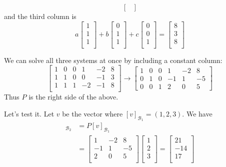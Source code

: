 \documentclass{article}
\begin{document}
\begin{example}
\[\begin{bmatrix}
    \end{bmatrix}
  \] and the third column is \[
    a
    \begin{bmatrix}
      1 \\1\\1\\
    \end{bmatrix}+b
    \begin{bmatrix}
      0 \\1\\1\\
    \end{bmatrix} + c
    \begin{bmatrix}
      0 \\0\\1\\
    \end{bmatrix} =
    \begin{bmatrix}
      8 \\3\\8\\
    \end{bmatrix}
  \]

  We can solve all three systems at once by including a constant column:
  \[
    \left[
      \begin{array}{ccc|ccc}
        1 & 0 & 0 & 1  & -2 & 8 \\
        1 & 1 & 0 & 0  & -1 & 3 \\
        1 & 1 & 1 & -2 & -1 & 8 \\
      \end{array}\right] \to \left[
      \begin{array}{ccc|ccc}
        1 & 0 & 0 & 1  & -2 & 8  \\
        0 & 1 & 0 & -1 & 1  & -5 \\
        0 & 0 & 1 & 2  & 0  & 5
      \end{array}\right]
  \]
  Thus $P$ is the right side of the above.

  Let's test it. Let $v$ be the vector where $[v]_{\mathcal{B}_1} = (1, 2, 3)$. We have
  \begin{align*}
    [v]_{\mathcal{B}_2} & = P[v]_{\mathcal{B}_1} \\
                        & =
    \begin{bmatrix}
      1  & -2 & 8  \\
      -1 & 1  & -5 \\
      2  & 0  & 5  \\
    \end{bmatrix}
    \begin{bmatrix}
      1 \\2\\3\\
    \end{bmatrix} =
    \begin{bmatrix}
      21 \\-14\\17\\
    \end{bmatrix}
  \end{align*}


\end{example}
\end{document}
